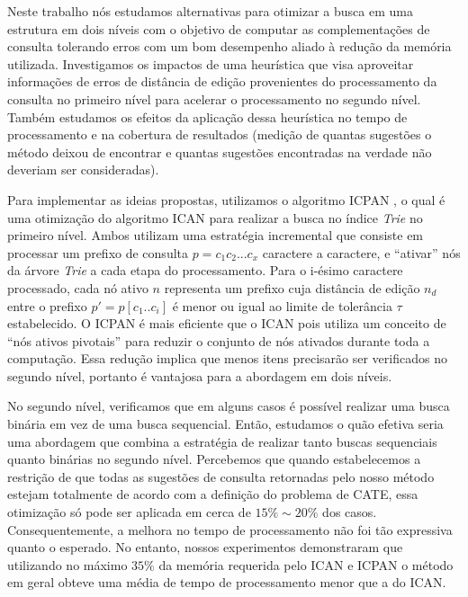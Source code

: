 Neste trabalho nós estudamos alternativas para otimizar a busca em uma estrutura em dois níveis com o objetivo de computar as complementações de consulta tolerando erros com um bom desempenho aliado à redução da memória utilizada. Investigamos os impactos de uma heurística que visa aproveitar informações de erros de distância de edição provenientes do processamento da consulta no primeiro nível para acelerar o processamento no segundo nível. Também estudamos os efeitos da aplicação dessa heurística no tempo de processamento e na cobertura de resultados (medição de quantas sugestões o método deixou de encontrar e quantas sugestões encontradas na verdade não deveriam ser consideradas). 

Para implementar as ideias propostas, utilizamos o algoritmo ICPAN \citep{li2011efficient}, o qual é uma otimização do algoritmo ICAN \citep{ji2009efficient} para realizar a busca no índice \textit{Trie} no primeiro nível. Ambos utilizam uma estratégia incremental que consiste em processar um prefixo de consulta $p=c_{1}c_{2}...c_{x}$ caractere a caractere, e ``ativar'' nós da árvore \textit{Trie} a cada etapa do processamento. Para o i-ésimo caractere processado, cada nó ativo $n$ representa um prefixo cuja distância de edição $n_{d}$ entre o prefixo $p'=p[c_{1}..c_{i}]$ é menor ou igual ao limite de tolerância $\tau$ estabelecido. O ICPAN é mais eficiente que o ICAN pois utiliza um conceito de ``nós ativos pivotais'' para reduzir o conjunto de nós ativados durante toda a computação. Essa redução implica que menos itens precisarão ser verificados no segundo nível, portanto é vantajosa para a abordagem em dois níveis.

No segundo nível, verificamos que em alguns casos é possível realizar uma busca binária em vez de uma busca sequencial. Então, estudamos o quão efetiva seria uma abordagem que combina a estratégia de realizar tanto buscas sequenciais quanto binárias no segundo nível. Percebemos que quando estabelecemos a restrição de que todas as sugestões de consulta retornadas pelo nosso método estejam totalmente de acordo com a definição do problema de CATE, essa otimização só pode ser aplicada em cerca de $15\%\sim20\%$ dos casos. Consequentemente, a melhora no tempo de processamento não foi tão expressiva quanto o esperado. No entanto, nossos experimentos demonstraram que utilizando no máximo $35\%$ da memória requerida pelo ICAN e ICPAN o método em geral obteve uma média de tempo de processamento menor que a do ICAN.

